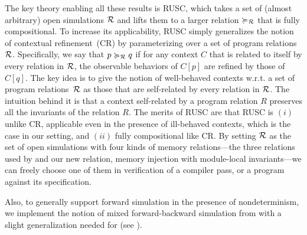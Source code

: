 The key theory enabling all these results is RUSC, which takes a set
of (almost arbitrary) open simulations $\mathcal{R}$ and lifts them to a
larger relation $\succcurlyeq_{\mathcal{R}}$ that is fully compositional.
To increase its applicability, RUSC simply generalizes the notion of contextual refinement~(CR)
by parameterizing over a set of program relations $\mathcal{R}$.
Specifically, we say that $p \succcurlyeq_{\mathcal{R}} q$ if for any
context $C$ that is related to itself by every relation in $\mathcal{R}$,
the observable behaviors of $C[p]$ are refined by those of $C[q]$.  The
key idea is to give the notion of well-behaved contexts w.r.t. a set
of program relations~$\mathcal{R}$ as those that are self-related by every
relation in $\mathcal{R}$. The intuition behind it is that a context
self-related by a program relation $R$ preserves all the invariants of
the relation $R$.  The merits of RUSC are that RUSC is $(i)$ unlike CR,
applicable even in the presence of ill-behaved contexts,
which is the case in our setting, and $(ii)$ fully compositional like
CR.  By setting $\mathcal{R}$ as the set of open simulations with four kinds
of memory relations---the three relations used by \cc{} and our new
relation, memory injection with module-local invariants---we can
freely choose one of them in verification of a compiler pass,
or a program against its specification.


Also, to generally support forward simulation in the presence of nondeterminism,
we implement
the notion of mixed forward-backward simulation from \cite{neis:pilsner}
with a slight generalization needed for \cc{}
(see ).

